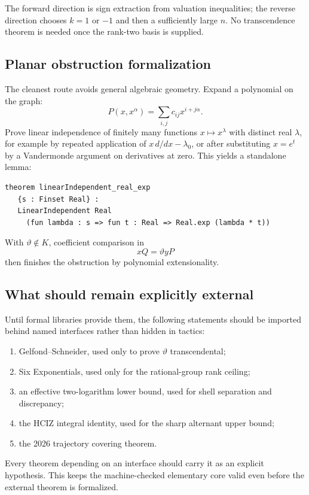 \documentclass[10pt,oneside]{article}
\theoremstyle{definition}
\theoremstyle{remark}
\newcommand{\thetaq}{\vartheta}
\begin{document}
The forward direction is sign extraction from valuation inequalities; the reverse direction chooses \(k=1\) or \(-1\) and then a sufficiently large \(n\).  No transcendence theorem is needed once the rank-two basis is supplied.

\subsection{Planar obstruction formalization}
The cleanest route avoids general algebraic geometry.  Expand a polynomial on the graph:
\[
 P(x,x^\alpha)=\sum_{i,j}c_{ij}x^{i+j\alpha}.
\]
Prove linear independence of finitely many functions \(x\mapsto x^{\lambda}\) with distinct real \(\lambda\), for example by repeated application of \(x\,d/dx-\lambda_0\), or after substituting \(x=e^t\) by a Vandermonde argument on derivatives at zero.  This yields a standalone lemma:

\begin{lstlisting}[style=code,language={},caption={Key analytic lemma for Zariski density.}]
 theorem linearIndependent_real_exp
   {s : Finset Real} :
   LinearIndependent Real
     (fun lambda : s => fun t : Real => Real.exp (lambda * t))
\end{lstlisting}

With \(\thetaq\notin K\), coefficient comparison in
\[
 xQ=\thetaq yP
\]
then finishes the obstruction by polynomial extensionality.

\subsection{What should remain explicitly external}
Until formal libraries provide them, the following statements should be imported behind named interfaces rather than hidden in tactics:
\begin{enumerate}
\item Gelfond--Schneider, used only to prove \(\thetaq\) transcendental;
\item Six Exponentials, used only for the rational-group rank ceiling;
\item an effective two-logarithm lower bound, used for shell separation and discrepancy;
\item the HCIZ integral identity, used for the sharp alternant upper bound;
\item the 2026 trajectory covering theorem.
\end{enumerate}
Every theorem depending on an interface should carry it as an explicit hypothesis.  This keeps the machine-checked elementary core valid even before the external theorem is formalized.
\end{document}
